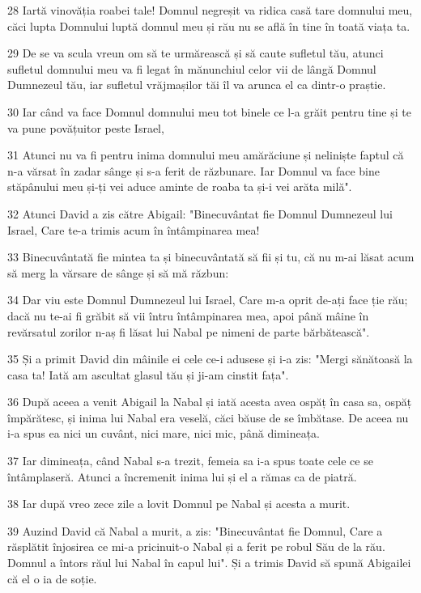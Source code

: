 \par 28 Iartă vinovăția roabei tale! Domnul negreșit va ridica casă tare domnului meu, căci lupta Domnului luptă domnul meu și rău nu se află în tine în toată viața ta.
\par 29 De se va scula vreun om să te urmărească și să caute sufletul tău, atunci sufletul domnului meu va fi legat în mănunchiul celor vii de lângă Domnul Dumnezeul tău, iar sufletul vrăjmașilor tăi îl va arunca el ca dintr-o praștie.
\par 30 Iar când va face Domnul domnului meu tot binele ce l-a grăit pentru tine și te va pune povățuitor peste Israel,
\par 31 Atunci nu va fi pentru inima domnului meu amărăciune și neliniște faptul că n-a vărsat în zadar sânge și s-a ferit de răzbunare. Iar Domnul va face bine stăpânului meu și-ți vei aduce aminte de roaba ta și-i vei arăta milă".
\par 32 Atunci David a zis către Abigail: "Binecuvântat fie Domnul Dumnezeul lui Israel, Care te-a trimis acum în întâmpinarea mea!
\par 33 Binecuvântată fie mintea ta și binecuvântată să fii și tu, că nu m-ai lăsat acum să merg la vărsare de sânge și să mă răzbun:
\par 34 Dar viu este Domnul Dumnezeul lui Israel, Care m-a oprit de-ați face ție rău; dacă nu te-ai fi grăbit să vii întru întâmpinarea mea, apoi până mâine în revărsatul zorilor n-aș fi lăsat lui Nabal pe nimeni de parte bărbătească".
\par 35 Și a primit David din mâinile ei cele ce-i adusese și i-a zis: "Mergi sănătoasă la casa ta! Iată am ascultat glasul tău și ji-am cinstit fața".
\par 36 După aceea a venit Abigail la Nabal și iată acesta avea ospăț în casa sa, ospăț împărătesc, și inima lui Nabal era veselă, căci băuse de se îmbătase. De aceea nu i-a spus ea nici un cuvânt, nici mare, nici mic, până dimineața.
\par 37 Iar dimineața, când Nabal s-a trezit, femeia sa i-a spus toate cele ce se întâmplaseră. Atunci a încremenit inima lui și el a rămas ca de piatră.
\par 38 Iar după vreo zece zile a lovit Domnul pe Nabal și acesta a murit.
\par 39 Auzind David că Nabal a murit, a zis: "Binecuvântat fie Domnul, Care a răsplătit înjosirea ce mi-a pricinuit-o Nabal și a ferit pe robul Său de la rău. Domnul a întors răul lui Nabal în capul lui". Și a trimis David să spună Abigailei că el o ia de soție.
